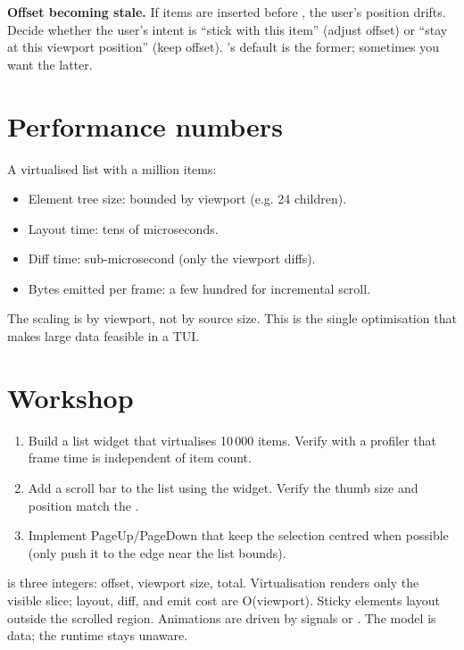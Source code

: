 \begin{warning}
\textbf{Offset becoming stale.} If items are inserted before
, the user's position drifts. Decide whether the
user's intent is ``stick with this item'' (adjust offset) or
``stay at this viewport position'' (keep offset). \maya{}'s
default is the former; sometimes you want the latter.
\end{warning}

\section{Performance numbers}

A virtualised list with a million items:

\begin{itemize}[leftmargin=*]
  \item Element tree size: bounded by viewport (e.g. 24
    children).
  \item Layout time: tens of microseconds.
  \item Diff time: sub-microsecond (only the viewport diffs).
  \item Bytes emitted per frame: a few hundred for incremental
    scroll.
\end{itemize}

The scaling is by viewport, not by source size. This is the
single optimisation that makes large data feasible in a TUI.

\section*{Workshop}

\begin{enumerate}[leftmargin=*]
  \item Build a list widget that virtualises 10\,000 items.
    Verify with a profiler that frame time is independent of
    item count.
  \item Add a scroll bar to the list using the 
    widget. Verify the thumb size and position match the
    .
  \item Implement PageUp/PageDown that keep the selection
    centred when possible (only push it to the edge near the
    list bounds).
\end{enumerate}

\begin{recap}
 is three integers: offset, viewport size,
total. Virtualisation renders only the visible slice; layout,
diff, and emit cost are O(viewport). Sticky elements layout
outside the scrolled region. Animations are driven by signals
or . The model is data; the runtime stays
unaware.
\end{recap}

